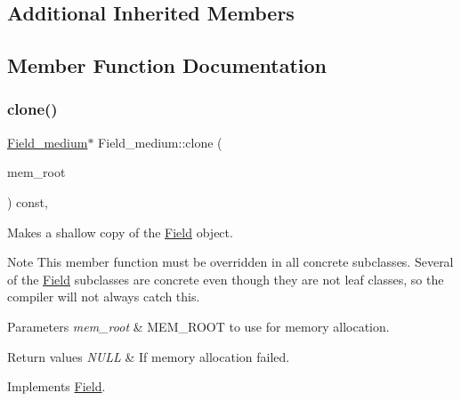 \subsection*{Additional Inherited Members}


\subsection{Member Function Documentation}
\mbox{\label{classField__medium_a6e9367d7b4a2f52eca8ec485f62c18e3}} 
\subsubsection{\texorpdfstring{clone()}{clone()}\hspace{0.1cm}{\footnotesize\ttfamily [1/2]}}
{\footnotesize\ttfamily \mbox{\hyperlink{classField__medium}{Field\+\_\+medium}}$\ast$ Field\+\_\+medium\+::clone (\begin{DoxyParamCaption}\item[{M\+E\+M\+\_\+\+R\+O\+OT $\ast$}]{mem\+\_\+root }\end{DoxyParamCaption}) const\hspace{0.3cm}{\ttfamily [inline]}, {\ttfamily [virtual]}}

Makes a shallow copy of the \mbox{\hyperlink{classField}{Field}} object.

\begin{DoxyNote}{Note}
This member function must be overridden in all concrete subclasses. Several of the \mbox{\hyperlink{classField}{Field}} subclasses are concrete even though they are not leaf classes, so the compiler will not always catch this.
\end{DoxyNote}

\begin{DoxyParams}{Parameters}
{\em mem\+\_\+root} & M\+E\+M\+\_\+\+R\+O\+OT to use for memory allocation. \\
\hline
\end{DoxyParams}

\begin{DoxyRetVals}{Return values}
{\em N\+U\+LL} & If memory allocation failed. \\
\hline
\end{DoxyRetVals}


Implements \mbox{\hyperlink{classField_a64979bcb9345803b031fff76a0c3d9fe}{Field}}.

